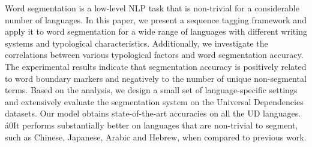 Word segmentation is a low-level NLP task that is non-trivial for a considerable number of languages. In this paper, we present a sequence tagging framework and apply it to word segmentation for a wide range of languages with different writing systems and typological characteristics. Additionally, we investigate the correlations between various typological factors and word segmentation accuracy. The experimental results indicate that segmentation accuracy is positively related to word boundary markers and negatively to the number of unique non-segmental terms. Based on the analysis, we design a small set of language-specific settings and extensively evaluate the segmentation system on the Universal Dependencies datasets. Our model obtains state-of-the-art accuracies on all the UD languages. \'a0It performs substantially better on languages that are non-trivial to segment, such as Chinese, Japanese, Arabic and Hebrew, when compared to previous work.
